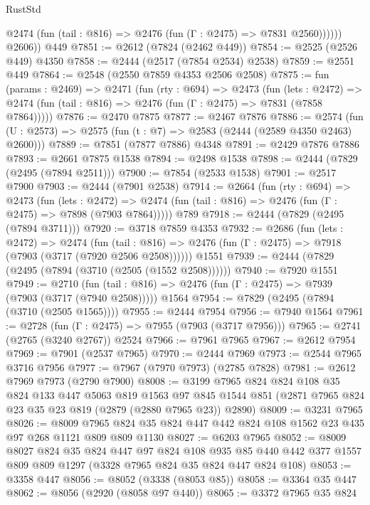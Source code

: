 \begin{lexlean}{RustStd}
\begin{coremodule}
              @2474 (fun (tail : @816) => @2476 (fun (Γ : @2475) => @7831 @2560))))))
        @2606))
    @449
@7851 := @2612 (@7824 (@2462 @449))
@7854 := @2525 (@2526 @449) @4350
@7858 := @2444 (@2517 (@7854 @2534) @2538)
@7859 := @2551 @449
@7864 := @2548 (@2550 @7859 @4353 @2506 @2508)
@7875 := fun (params : @2469) =>
  @2471
    (fun (rty : @694) =>
    @2473
      (fun (lets : @2472) =>
      @2474 (fun (tail : @816) => @2476 (fun (Γ : @2475) => @7831 (@7858 @7864)))))
@7876 := @2470 @7875
@7877 := @2467 @7876
@7886 := @2574 (fun (U : @2573) => @2575 (fun (t : @7) => @2583 (@2444 (@2589 @4350 @2463) @2600)))
@7889 := @7851 (@7877 @7886) @4348
@7891 := @2429 @7876 @7886
@7893 := @2661 @7875 @1538
@7894 := @2498 @1538
@7898 := @2444 (@7829 (@2495 (@7894 @2511)))
@7900 := @7854 (@2533 @1538)
@7901 := @2517 @7900
@7903 := @2444 (@7901 @2538)
@7914 := @2664
    (fun (rty : @694) =>
    @2473
      (fun (lets : @2472) =>
      @2474 (fun (tail : @816) => @2476 (fun (Γ : @2475) => @7898 (@7903 @7864)))))
    @789
@7918 := @2444 (@7829 (@2495 (@7894 @3711)))
@7920 := @3718 @7859 @4353
@7932 := @2686
    (fun (lets : @2472) =>
    @2474
      (fun (tail : @816) => @2476 (fun (Γ : @2475) => @7918 (@7903 (@3717 (@7920 @2506 @2508))))))
    @1551
@7939 := @2444 (@7829 (@2495 (@7894 (@3710 (@2505 (@1552 @2508))))))
@7940 := @7920 @1551
@7949 := @2710
    (fun (tail : @816) => @2476 (fun (Γ : @2475) => @7939 (@7903 (@3717 (@7940 @2508)))))
    @1564
@7954 := @7829 (@2495 (@7894 (@3710 (@2505 @1565))))
@7955 := @2444 @7954
@7956 := @7940 @1564
@7961 := @2728 (fun (Γ : @2475) => @7955 (@7903 (@3717 @7956)))
@7965 := @2741 (@2765 (@3240 @2767)) @2524
@7966 := @7961 @7965
@7967 := @2612 @7954
@7969 := @7901 (@2537 @7965)
@7970 := @2444 @7969
@7973 := @2544 @7965 @3716 @7956
@7977 := @7967 (@7970 @7973) (@2785 @7828)
@7981 := @2612 @7969 @7973 (@2790 @7900)
@8008 := @3199
    @7965
    @824
    @824
    @108
    @35
    @824
    @133
    @447
    @5063
    @819
    @1563
    @97
    @845
    @1544
    @851
    (@2871 @7965 @824 @23 @35 @23 @819 (@2879 (@2880 @7965 @23)) @2890)
@8009 := @3231 @7965
@8026 := @8009 @7965 @824 @35 @824 @447 @442 @824 @108 @1562 @23 @435 @97 @268 @1121 @809 @809 @1130
@8027 := @6203 @7965
@8052 := @8009
    @8027
    @824
    @35
    @824
    @447
    @97
    @824
    @108
    @935
    @85
    @440
    @442
    @377
    @1557
    @809
    @809
    @1297
    (@3328 @7965 @824 @35 @824 @447 @824 @108)
@8053 := @3358 @447
@8056 := @8052 (@3338 (@8053 @85))
@8058 := @3364 @35 @447
@8062 := @8056 (@2920 (@8058 @97 @440))
@8065 := @3372 @7965 @35 @824

\end{coremodule}
\end{lexlean}
